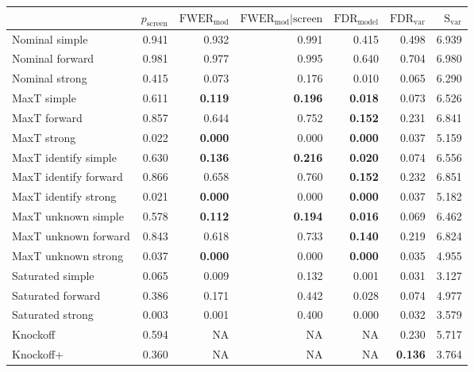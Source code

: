 
\newcommand{\guarantee}[1]{{\bf #1}}
\begin{tabular}{|l|rrrrrr|}
 \hline
{} &  $p_{\text{screen}}$ &  $\text{FWER}_{\text{mod}}$ &  $\text{FWER}_{\text{mod}} \vert \text{screen}$ &  $\text{FDR}_{\text{model}}$ &  $\text{FDR}_{\text{var}}$ &  $\text{S}_{\text{var}}$ \\ \hline
Nominal simple & 0.941 & 0.932 & 0.991 & 0.415 & 0.498 & 6.939 \\ 
Nominal forward & 0.981 & 0.977 & 0.995 & 0.640 & 0.704 & 6.980 \\ 
Nominal strong & 0.415 & 0.073 & 0.176 & 0.010 & 0.065 & 6.290 \\ 
MaxT simple & 0.611 & \guarantee{0.119} & \guarantee{0.196} & \guarantee{0.018} & 0.073 & 6.526 \\ 
MaxT forward & 0.857 & 0.644 & 0.752 & \guarantee{0.152} & 0.231 & 6.841 \\ 
MaxT strong & 0.022 & \guarantee{0.000} & 0.000 & \guarantee{0.000} & 0.037 & 5.159 \\ 
MaxT identify simple & 0.630 & \guarantee{0.136} & \guarantee{0.216} & \guarantee{0.020} & 0.074 & 6.556 \\ 
MaxT identify forward & 0.866 & 0.658 & 0.760 & \guarantee{0.152} & 0.232 & 6.851 \\ 
MaxT identify strong & 0.021 & \guarantee{0.000} & 0.000 & \guarantee{0.000} & 0.037 & 5.182 \\ 
MaxT unknown simple & 0.578 & \guarantee{0.112} & \guarantee{0.194} & \guarantee{0.016} & 0.069 & 6.462 \\ 
MaxT unknown forward & 0.843 & 0.618 & 0.733 & \guarantee{0.140} & 0.219 & 6.824 \\ 
MaxT unknown strong & 0.037 & \guarantee{0.000} & 0.000 & \guarantee{0.000} & 0.035 & 4.955 \\ 
Saturated simple & 0.065 & 0.009 & 0.132 & 0.001 & 0.031 & 3.127 \\ 
Saturated forward & 0.386 & 0.171 & 0.442 & 0.028 & 0.074 & 4.977 \\ 
Saturated strong & 0.003 & 0.001 & 0.400 & 0.000 & 0.032 & 3.579 \\ 
Knockoff & 0.594 & NA & NA & NA & 0.230 & 5.717 \\ 
Knockoff+ & 0.360 & NA & NA & NA & \guarantee{0.136} & 3.764 \\   \hline
\end{tabular}